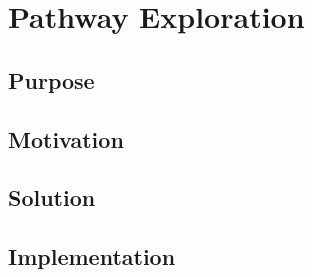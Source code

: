 \chapter{Pathway Exploration}

\section{Purpose}

\section{Motivation}

\section{Solution}

\section{Implementation}